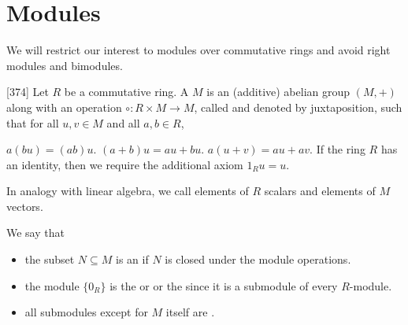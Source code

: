 \section{Modules}\label{sec:modules}

\begin{note}\label{note:module_over_commutative_ring}
  We will restrict our interest to modules over commutative rings and avoid right modules and bimodules.
\end{note}

\begin{definition}\label{def:module}\cite{Knapp2016BAlg}[374]
  Let \( R \) be a commutative ring. A  \( M \) is an (additive) abelian group \( (M, +) \) along with an operation \( \circ: R \times M \to M \), called  and denoted by juxtaposition, such that for all \( u, v \in M \) and all \( a, b \in R \),
  \begin{description}
     \( a (b u) = (a b) u \).
     \( (a + b) u = a u + b u \).
     \( a (u + v) = a u + a v \).
     If the ring \( R \) has an identity, then we require the additional axiom \( 1_R u = u \).
  \end{description}

  In analogy with linear algebra, we call elements of \( R \) scalars and elements of \( M \) vectors.

  We say that
  \begin{itemize}
    \item the subset \( N \subseteq M \) is an  if \( N \) is closed under the module operations.
    \item the module \( \{ 0_R \} \) is the  or  or the  since it is a submodule of every \( R \)-module.
    \item all submodules except for \( M \) itself are .
  \end{itemize}
\end{definition}

